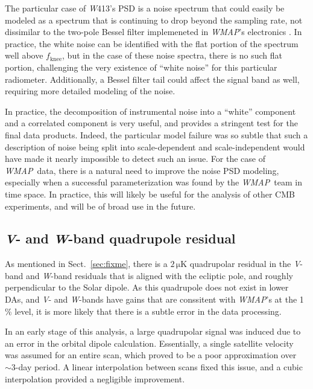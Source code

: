\documentclass[twocolumn]{../../common/aa}
\def\WMAP{\emph{WMAP}}
\newcommand{\V}[0]{\textit V}
\newcommand{\W}[0]{\textit W}
\begin{document}

The particular case of \W413's PSD is a noise spectrum that could easily be modeled as a spectrum that is continuing to drop beyond the sampling rate, not dissimilar to the two-pole Bessel filter implemeneted in \WMAP's electronics \citep{jarosik2003:MAP}. In practice, the white noise can be identified with the flat portion of the spectrum well above $f_\mathrm{knee}$, but in the case of these noise spectra, there is no such flat portion, challenging the very existence of ``white noise'' for this particular radiometer. Additionally, a Bessel filter tail could affect the signal band as well, requiring more detailed modeling of the noise.

In practice, the decomposition of instrumental noise into a ``white'' component and a correlated component is very useful, and provides a stringent test for the final data products. Indeed, the particular model failure was so subtle that such a description of noise being split into scale-dependent and scale-independent would have made it nearly impossible to detect such an issue.
For the case of \WMAP\ data, there is a natural need to improve the noise PSD modeling, especially when a successful parameterization was found by the \WMAP\ team in time space. In practice, this will likely be useful for the analysis of other CMB experiments, and will be of broad use in the future.

\subsection{\V- and \W-band quadrupole residual}
\label{sec:quadres}

As mentioned in Sect.~\ref{sec:fixme}, there is a $2\,\mathrm{\mu K}$ quadrupolar residual in the \V-band and \W-band residuals that is aligned with the ecliptic pole, and roughly perpendicular to the Solar dipole. As this quadrupole does not exist in lower DAs, and \V- and \W-bands have gains that are conssitent with \WMAP's at the 1\,\% level, it is more likely that there is a subtle error in the data processing.

In an early stage of this analysis, a large quadrupolar signal was induced due to an error in the orbital dipole calculation. Essentially, a single satellite velocity was assumed for an entire scan, which proved to be a poor approximation over $\sim3$-day period. A linear interpolation between scans fixed this issue, and a cubic interpolation provided a negligible improvement.
\end{document}
